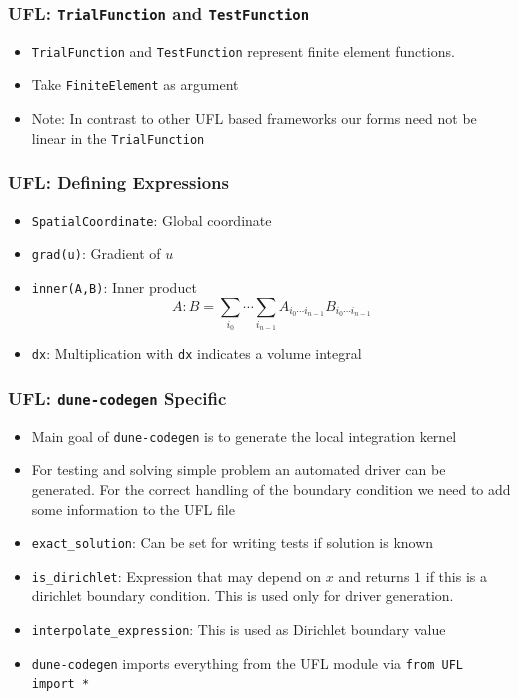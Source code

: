 \documentclass[aspectratio=169,11pt]{beamer}
\theoremstyle{definition}
\begin{document}
\begin{frame}[fragile]
  \frametitle{UFL: \lstinline{TrialFunction} and \lstinline{TestFunction}}

  
  \vfill
  \begin{itemize}
  \item \lstinline{TrialFunction} and \lstinline{TestFunction} represent finite element functions.
  \item Take \lstinline{FiniteElement} as argument
  \item Note: In contrast to other UFL based frameworks our forms need not be
    linear in the \lstinline{TrialFunction}
  \end{itemize}
\end{frame}

\begin{frame}
  \frametitle{UFL: Defining Expressions}
  
  \vfill
  \begin{itemize}
  \item \lstinline{SpatialCoordinate}: Global coordinate
  \item \lstinline{grad(u)}: Gradient of $u$
  \item \lstinline{inner(A,B)}: Inner product
    \begin{equation*}
      A:B = \sum_{i_0}\cdots\sum_{i_{n-1}}A_{i_0\cdots i_{n-1}}B_{i_0\cdots i_{n-1}}
    \end{equation*}
  \item \lstinline{dx}: Multiplication with \lstinline{dx} indicates a volume
    integral
  \end{itemize}
\end{frame}

\begin{frame}
  \frametitle{UFL: \lstinline{dune-codegen} Specific}
  
  \vfill
  \begin{itemize}
  \item Main goal of \lstinline{dune-codegen} is to generate the local integration kernel
  \item For testing and solving simple problem an automated driver can be
    generated. For the correct handling of the boundary condition we need to
    add some information to the UFL file
  \item \lstinline{exact_solution}: Can be set for writing tests if solution is known
  \item \lstinline{is_dirichlet}: Expression that may depend on $x$ and returns
    $1$ if this is a dirichlet boundary condition. This is used only for driver
    generation.
  \item \lstinline{interpolate_expression}: This is used as Dirichlet boundary value
  \item \lstinline{dune-codegen} imports everything from the UFL module via
    \lstinline{from UFL import *}
  \end{itemize}
\end{frame}
\end{document}
